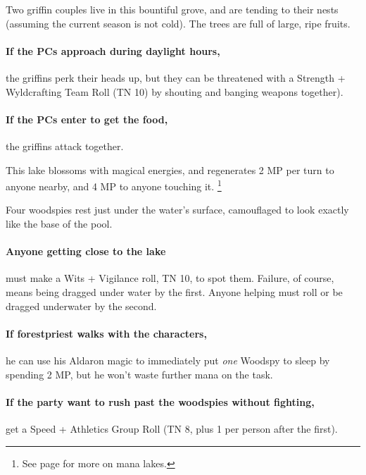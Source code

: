 \begin{multicols}{2}
Two griffin couples live in this bountiful grove, and are tending to their nests (assuming the current season is not cold).
The trees are full of large, ripe fruits.


\paragraph{If the PCs approach during daylight hours,}
the griffins perk their heads up, but they can be threatened with a Strength + Wyldcrafting Team Roll (TN 10) by shouting and banging weapons together).

\paragraph{If the PCs enter to get the food,}
the griffins attack together.


This lake blossoms with magical energies, and regenerates 2 MP per turn to anyone nearby, and 4 MP to anyone touching it.%
\footnote{See page \pageref{mana_lake} for more on mana lakes.}

Four woodspies rest just under the water's surface, camouflaged to look exactly like the base of the pool.

\paragraph{Anyone getting close to the lake}
must make a Wits + Vigilance roll, TN 10, to spot them.
Failure, of course, means being dragged under water by the first.
Anyone helping must roll or be dragged underwater by the second.

\paragraph{If \gls{forestpriest} walks with the characters,}
he can use his Aldaron magic to immediately put \emph{one} Woodspy to sleep by spending 2 MP, but he won't waste further mana on the task.

\paragraph{If the party want to rush past the woodspies without fighting,}
get a Speed + Athletics Group Roll (TN 8, plus 1 per person after the first).


\end{multicols}
